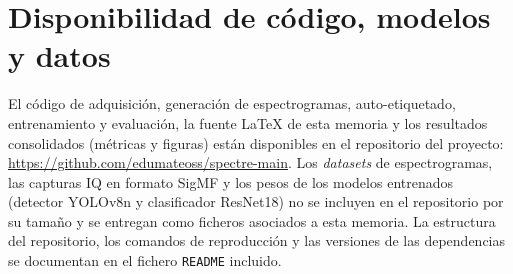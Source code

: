 \section{Disponibilidad de código, modelos y datos}
\label{anexo:disponibilidad}

El código de adquisición, generación de espectrogramas, auto-etiquetado, entrenamiento y evaluación, la fuente \LaTeX{} de esta memoria y los resultados consolidados (métricas y figuras) están disponibles en el repositorio del proyecto: \url{https://github.com/edumateoss/spectre-main}. Los \emph{datasets} de espectrogramas, las capturas IQ en formato SigMF y los pesos de los modelos entrenados (detector YOLOv8n y clasificador ResNet18) no se incluyen en el repositorio por su tamaño y se entregan como ficheros asociados a esta memoria. La estructura del repositorio, los comandos de reproducción y las versiones de las dependencias se documentan en el fichero \texttt{README} incluido.
